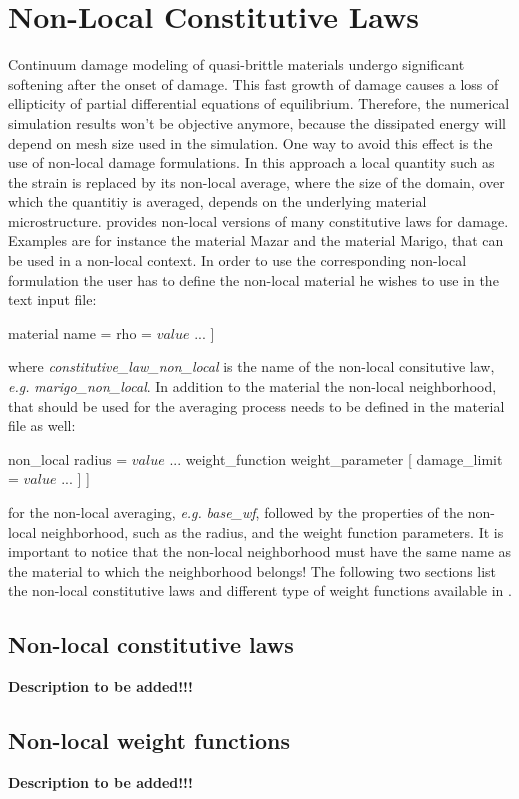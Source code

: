 \section{Non-Local Constitutive Laws \label{sect:smm:CLNL}}

Continuum damage modeling of quasi-brittle materials undergo significant softening after the onset of damage. This fast growth of damage causes a loss of ellipticity of partial differential equations of equilibrium. Therefore, the numerical simulation results won't be objective anymore, because the dissipated energy will depend on mesh size used in the simulation. One way to avoid this effect is the use of non-local damage formulations. In this approach a local quantity such as the strain is replaced by its non-local average, where the size of the domain, over which the quantitiy is averaged, depends on the underlying material microstructure. 
\akantu provides non-local versions of many constitutive laws for damage. Examples are for instance the material Mazar and the material Marigo, that can be used in a non-local context. In order to use the corresponding non-local formulation the user has to define the non-local material he wishes to use in the text input file:
\begin{cpp}
  material %
     name = %
     rho = $value$
     ...
  ]
\end{cpp}
where \emph{constitutive\_law\_non\_local} is the name of the non-local consitutive law, \textit{e.g.} \emph{marigo\_non\_local}.
In addition to the material the non-local neighborhood, that should be used for the averaging process needs to be defined in the material file as well: 
\begin{cpp}
  non_local %
     radius = $value$
     ...
      weight_function weight_parameter [
        damage_limit = $value$
        ...
     ]
  ]
\end{cpp}
for the non-local averaging, \textit{e.g.} \emph{base\_wf}, followed by the properties of the non-local neighborhood, such as the radius, and the weight function parameters. It is important to notice that the non-local neighborhood must have the same name as the material to which the neighborhood belongs!
The following two sections list the non-local constitutive laws and different type of weight functions available in \akantu.
\subsection{Non-local constitutive laws}
\textbf{Description to be added!!!}
\subsection{Non-local weight functions}
 \textbf{Description to be added!!!}